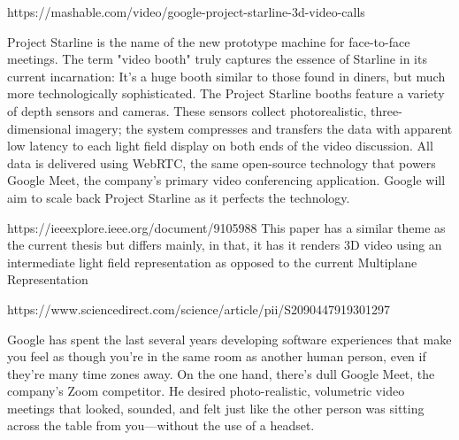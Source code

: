

https://mashable.com/video/google-project-starline-3d-video-calls


Project Starline is the name of the new prototype machine for face-to-face meetings. The term "video booth" truly captures the essence of Starline in its current incarnation: It's a huge booth similar to those found in diners, but much more technologically sophisticated. The Project Starline booths feature a variety of depth sensors and cameras. These sensors collect photorealistic, three-dimensional imagery; the system compresses and transfers the data with apparent low latency to each light field display on both ends of the video discussion. All data is delivered using WebRTC, the same open-source technology that powers Google Meet, the company's primary video conferencing application. Google will aim to scale back Project Starline as it perfects the technology.



https://ieeexplore.ieee.org/document/9105988
This paper has a similar theme as the current thesis but differs mainly, in that, it has it renders 3D video using an intermediate light field representation as opposed to the current Multiplane Representation

https://www.sciencedirect.com/science/article/pii/S2090447919301297



Google has spent the last several years developing software experiences that make you feel as though you're in the same room as another human person, even if they're many time zones away. On the one hand, there's dull Google Meet, the company's Zoom competitor. He desired photo-realistic, volumetric video meetings that looked, sounded, and felt just like the other person was sitting across the table from you—without the use of a headset.

